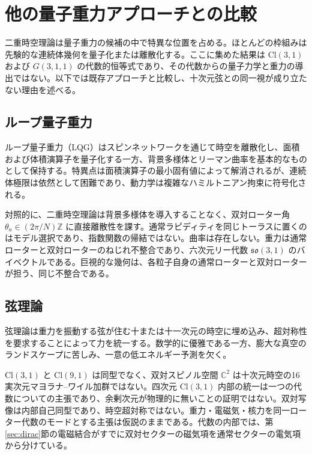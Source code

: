 \documentclass[a4paper]{article}
\begin{document}
\section{他の量子重力アプローチとの比較}
\label{sec:comparison}

二重時空理論は量子重力の候補の中で特異な位置を占める。ほとんどの枠組みは先験的な連続体幾何を量子化または離散化する。ここに集めた結果は $\mathrm{Cl}(3,1)$ および $G(3,1,1)$ の代数的恒等式であり、その代数からの量子力学と重力の導出ではない。以下では既存アプローチと比較し、十次元弦との同一視が成り立たない理由を述べる。

\subsection{ループ量子重力}

ループ量子重力（LQG）はスピンネットワークを通じて時空を離散化し、面積および体積演算子を量子化する一方、背景多様体とリーマン曲率を基本的なものとして保持する。特異点は面積演算子の最小固有値によって解消されるが、連続体極限は依然として困難であり、動力学は複雑なハミルトニアン拘束に符号化される。

対照的に、二重時空理論は背景多様体を導入することなく、双対ローター角 $\theta_a \in (2\pi/N)\mathbb{Z}$ に直接離散性を課す。通常ラピディティを同じトーラスに置くのはモデル選択であり、指数関数の帰結ではない。曲率は存在しない。重力は通常ローターと双対ローターのねじれ不整合であり、六次元リー代数 $\mathfrak{so}(3,1)$ のバイベクトルである。巨視的な幾何は、各粒子自身の通常ローターと双対ローターが担う、同じ不整合である。

\subsection{弦理論}

弦理論は重力を振動する弦が住む十または十一次元の時空に埋め込み、超対称性を要求することによって力を統一する。数学的に優雅である一方、膨大な真空のランドスケープに苦しみ、一意の低エネルギー予測を欠く。

$\mathrm{Cl}(3,1)$ と $\mathrm{Cl}(9,1)$ は同型でなく、双対スピノル空間 $\mathbb{C}^2$ は十次元時空の16実次元マヨラナ--ワイル加群ではない。四次元 $\mathrm{Cl}(3,1)$ 内部の統一は一つの代数についての主張であり、余剰次元が物理的に無いことの証明ではない。双対写像は内部自己同型であり、時空超対称ではない。重力・電磁気・核力を同一ローター代数のモードとする主張は仮説のままである。代数の内部では、第\ref{sec:dirac}節の電磁結合がすでに双対セクターの磁気項を通常セクターの電気項から分けている。
\end{document}
